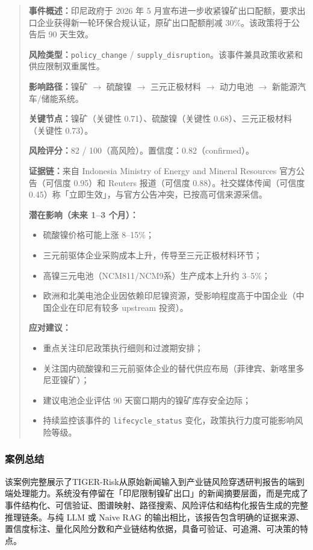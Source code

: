\documentclass[12pt,a4paper]{article}
\newcommand{\projectshort}{TIGER-Risk}
\begin{document}
\begin{quote}
\textbf{事件概述：}印尼政府于 2026 年 5 月宣布进一步收紧镍矿出口配额，要求出口企业获得新一轮环保合规认证，原矿出口配额削减 30\%。该政策将于公告后 90 天生效。

\textbf{风险类型：}\texttt{policy\_change} / \texttt{supply\_disruption}。该事件兼具政策收紧和供应限制双重属性。

\textbf{影响路径：}镍矿 $\to$ 硫酸镍 $\to$ 三元正极材料 $\to$ 动力电池 $\to$ 新能源汽车/储能系统。

\textbf{关键节点：}镍矿（关键性 0.71）、硫酸镍（关键性 0.68）、三元正极材料（关键性 0.73）。

\textbf{风险评分：}82 / 100（高风险）。置信度：0.82（confirmed）。

\textbf{证据链：}来自 Indonesia Ministry of Energy and Mineral Resources 官方公告（可信度 0.95）和 Reuters 报道（可信度 0.88）。社交媒体传闻（可信度 0.45）称「立即生效」，与官方公告冲突，已按高可信来源采信。

\textbf{潜在影响（未来 1--3 个月）：}
\begin{itemize}
    \item 硫酸镍价格可能上涨 8--15\%；
    \item 三元前驱体企业采购成本上升，传导至三元正极材料环节；
    \item 高镍三元电池（NCM811/NCM9系）生产成本上升约 3--5\%；
    \item 欧洲和北美电池企业因依赖印尼镍资源，受影响程度高于中国企业（中国企业在印尼有较多 upstream 投资）。
\end{itemize}

\textbf{应对建议：}
\begin{itemize}
    \item 重点关注印尼政策执行细则和过渡期安排；
    \item 关注国内硫酸镍和三元前驱体企业的替代供应布局（菲律宾、新喀里多尼亚镍矿）；
    \item 建议电池企业评估 90 天窗口期内的镍矿库存安全边际；
    \item 持续监控该事件的 \texttt{lifecycle\_status} 变化，政策执行力度可能影响风险等级。
\end{itemize}
\end{quote}

\subsubsection{案例总结}

该案例完整展示了\projectshort 从原始新闻输入到产业链风险穿透研判报告的端到端处理能力。系统没有停留在「印尼限制镍矿出口」的新闻摘要层面，而是完成了事件结构化、可信验证、图谱映射、路径搜索、风险评估和结构化报告生成的完整推理链条。与纯 LLM 或 Naive RAG 的输出相比，该报告包含明确的证据来源、置信度标注、量化风险分数和产业链结构依据，具备可验证、可追溯、可决策的特点。
\end{document}
